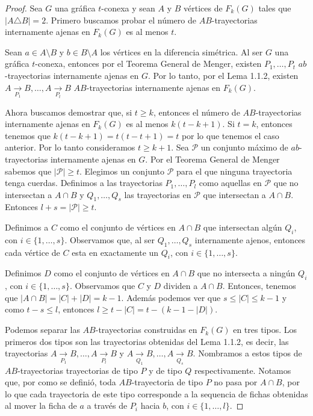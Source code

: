 \begin{proof}
    Sea $G$ una gr\'afica $t$-conexa y sean $A$ y $B$ v\'ertices de $F_{k}(G)$
    tales que $|A \triangle B| = 2$. Primero buscamos probar el n\'umero de
    $AB$-trayectorias internamente ajenas en $F_{k}(G)$ es al menos $t$. 
    
    Sean $a \in A \setminus B$ y $b \in B \setminus A$ los v\'ertices en la
    diferencia sim\'etrica. Al ser $G$ una gr\'afica $t$-conexa, entonces por el
    Teorema General de Menger, existen $P_{1}, \dots, P_{t}$ $ab$-trayectorias
    internamente ajenas en $G$. Por lo tanto, por el Lema 1.1.2, existen $A
    \xrightarrow[P_1]{}  B, \dots, A \xrightarrow[P_t]{}  B$ $AB$-trayectorias
    internamente ajenas en $F_{k}(G)$. 

    Ahora buscamos demostrar que, si $t \geq k$, entonces el n\'umero de
    $AB$-trayectorias internamente ajenas en $F_{k}(G)$ es al menos $k(t- k
    +1)$. Si $t=k$, entonces tenemos que $k(t - k + 1) = t(t-t+1) = t$ por lo
    que tenemos el caso anterior. Por lo tanto consideramos  $t \geq k + 1$. Sea
    $\mathcal{P}$ un conjunto m\'aximo de $ab$-trayectorias internamente ajenas
    en $G$. Por el Teorema General de Menger sabemos que $|\mathcal{P}| \ge t$.
    Elegimos un conjunto $\mathcal{P}$ para el que ninguna trayectoria tenga
    cuerdas. Definimos a las trayectorias $P_{1}, \dots, P_{l}$ como aquellas en
    $\mathcal{P}$ que no intersectan a $A \cap B$ y $Q_{1}, \dots, Q_{s}$ las
    trayectorias en $\mathcal{P}$ que intersectan a $A \cap B$. Entonces $l + s
    = |\mathcal{P}| \ge t$.

    Definimos a $C$ como el conjunto de v\'ertices en $A \cap B$ que intersectan
    alg\'un $Q_i$, con $i \in \{1, \dots, s\}$. Observamos que, al ser $Q_1,
    \dots, Q_s$ internamente ajenos, entonces cada v\'ertice de $C$ esta en
    exactamente un $Q_i$, con $i \in \{1, \dots, s\}$. 

    Definimos $D$ como el conjunto de v\'ertices en $A \cap B$ que no intersecta
    a ning\'un $Q_i$, con $i \in \{1, \dots, s\}$. Observamos que $C$ y $D$
    dividen a $A \cap B$. Entonces, tenemos que $|A\cap B| = |C| + |D| = k-1$.
    Adem\'as podemos ver que $s \leq |C| \leq k-1$ y como $ t - s \leq l$,
    entonces $l \geq t -|C| = t- (k-1-|D|)$.

    Podemos separar las $AB$-trayectorias construidas en $F_{k}(G)$ en tres
    tipos. Los primeros dos tipos son las trayectorias obtenidas del Lema 1.1.2,
    es decir, las trayectorias $A \xrightarrow[P_1]{}  B, \dots, A
    \xrightarrow[P_l]{}  B$ y $A \xrightarrow[Q_1]{}  B, \dots, A
    \xrightarrow[Q_s]{}  B$. Nombramos a estos tipos de $AB$-trayectorias
    trayectorias de tipo $P$ y de tipo $Q$ respectivamente. Notamos que, por
    como se defini\'o, toda $AB$-trayectoria de tipo $P$ no pasa por $A\cap B$,
    por lo que cada trayectoria de este tipo corresponde a la sequencia de
    fichas obtenidas al mover la ficha de $a$ a trav\'es de $P_i$ hacia $b$, con
    $i \in \{1, \dots, l\}$.
    

\end{proof}
